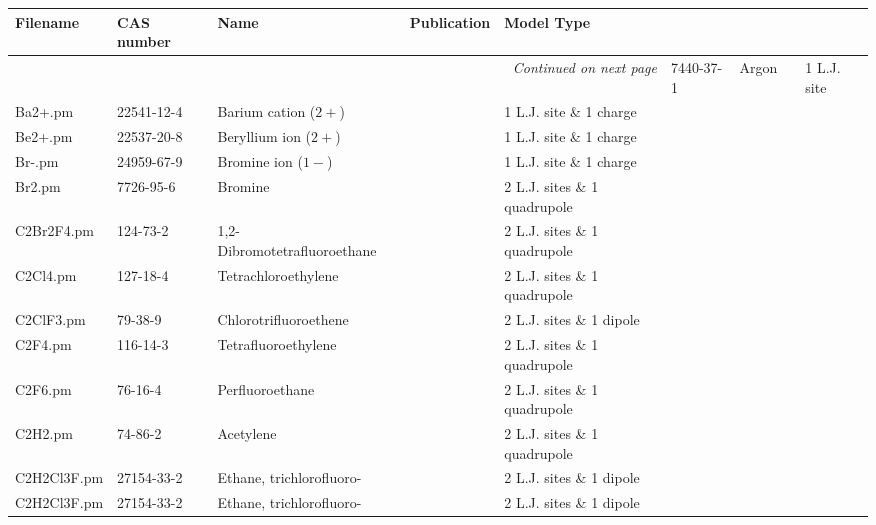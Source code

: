 \begin{landscape}
	\small
	\setlength\tabcolsep{8pt}
	\begin{longtable}{lllll}%
		\toprule
		\textbf{Filename} & \textbf{CAS number} &  		\textbf{Name} & \textbf{Publication} & \textbf{Model Type} \\
		\midrule
		\endhead
		\midrule
		\multicolumn{5}{r}{\textit{Continued on next page}}
		\endfoot
		\bottomrule
		\endlastfoot
	Ar.pm & 7440-37-1 & Argon & \parencite{Vrabec2001} & 1 L.J. site \\
	Ba2+.pm & 22541-12-4 & Barium cation ($2+$) & \parencite{Deublein2012_A} & 1 L.J. site \& 1 charge \\
	Be2+.pm & 22537-20-8 & Beryllium ion ($2+$) & \parencite{Deublein2012_A} & 1 L.J. site \& 1 charge \\
	Br-.pm & 24959-67-9 & Bromine ion ($1-$) & \parencite{Reiser2014} & 1 L.J. site \& 1 charge \\
	Br2.pm & 7726-95-6 & Bromine & \parencite{Vrabec2001} & 2 L.J. sites \& 1 quadrupole \\
	C2Br2F4.pm & 124-73-2 & 1,2-Dibromotetrafluoroethane & \parencite{Stoll2003} & 2 L.J. sites \& 1 quadrupole \\
	C2Cl4.pm & 127-18-4 & Tetrachloroethylene & \parencite{Stoll2004} & 2 L.J. sites \& 1 quadrupole \\
	C2ClF3.pm & 79-38-9 & Chlorotrifluoroethene & \parencite{Stoll2003} & 2 L.J. sites \& 1 dipole \\
	C2F4.pm & 116-14-3 & Tetrafluoroethylene & \parencite{Stoll2004} & 2 L.J. sites \& 1 quadrupole \\
	C2F6.pm & 76-16-4 & Perfluoroethane & \parencite{Stoll2004} & 2 L.J. sites \& 1 quadrupole \\
	C2H2.pm & 74-86-2 & Acetylene & \parencite{Vrabec2001} & 2 L.J. sites \& 1 quadrupole \\
	C2H2Cl3F.pm & 27154-33-2 & Ethane, trichlorofluoro- & \parencite{Stoll2003} & 2 L.J. sites \& 1 dipole \\
	C2H2Cl3F.pm & 27154-33-2 & Ethane, trichlorofluoro- & \parencite{Stoll2003} & 2 L.J. sites \& 1 dipole \\

\end{longtable}
\end{landscape}
